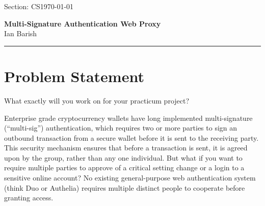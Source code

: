 \documentclass[12pt]{article}
\newcommand{\Section}{CS}                        %
\newcommand{\ProjectTitle}{Multi-Signature Authentication Web Proxy}
\newcommand{\AuthorName}{Ian Barish}
\newcommand{\ReportDate}{\today}
\begin{document}
\noindent Section: \Section \hfill \ReportDate \\[0.2em]
\begin{center}
  {\large \textbf{\ProjectTitle}} \\[0.3em]
  \AuthorName
\end{center}

\noindent\rule{\linewidth}{0.4pt}






\section{Problem Statement}

{\small What exactly will you work on for your practicum project?}

Enterprise grade cryptocurrency wallets have long implemented multi-signature (``multi-sig'') authentication, which requires two or more parties to sign an outbound transaction from a secure wallet before it is sent to the receiving party. This security mechanism ensures that before a transaction is sent, it is agreed upon by the group, rather than any one individual. But what if you want to require multiple parties to approve of a critical setting change or a login to a sensitive online account? No existing general-purpose web authentication system (think Duo or Authelia) requires multiple distinct people to cooperate before granting access.
\end{document}

